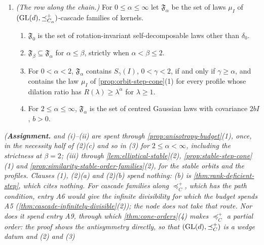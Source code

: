 \begin{theorem}
\begin{enumerate}
\begin{enumerate}
is the family of kernels from scale zero of a $(\GL(d), \preceq^+_C)$-cascade family if and only if
$\gamma \ge \beta(C)$. A $(\GL(d), \preceq^+_C)$-cascade family whose $\mu_I$ is not Gaussian exists if and only
if $\beta(C) < 2$; if $\beta(C) \ge 2$, the families are, as in (b), exactly the restrictions to the pairs
$\Sigma \preceq^+_C \Sigma'$ of the affine Gaussian scale spaces \ref{eq:affine-gaussian}, $b > 0$.
\end{enumerate}
\item \emph{(The row along the chain.)} For $0 \le \alpha \le \infty$ let $\mathfrak F_\alpha$ be the set of
laws $\mu_I$ of $(\mathrm{GL}(d), \preceq^+_{C_\alpha})$-cascade families of kernels.
\begin{enumerate}
\item[(a)] $\mathfrak F_0$ is the set of rotation-invariant self-decomposable laws other than $\delta_0$.
\item[(b)] $\mathfrak F_\beta \subseteq \mathfrak F_\alpha$ for $\alpha \le \beta$, strictly when
$\alpha < \beta \le 2$.
\item[(c)] For $0 < \alpha < 2$, $\mathfrak F_\alpha$ contains $S_\gamma(I)$, $0 < \gamma < 2$, if and only
if $\gamma \ge \alpha$, and contains the law $\mu_I$ of \ref{prop:orbit-step-cone}(1) for every profile whose
dilation ratio has $R(\lambda) \ge \lambda^\alpha$ for $\lambda \ge 1$.
\item[(d)] For $2 \le \alpha \le \infty$, $\mathfrak F_\alpha$ is the set of centred Gaussian laws with
covariance $2bI$, $b > 0$.
\end{enumerate}
\end{enumerate}
\statusA\quad{}\quad{}\quad\emph{(\textbf{Assignment.}  and (i)--(ii)
are spent through \ref{prop:anisotropy-budget}(1), once, in the necessity half of (2)(c) and so in (3) for
$2 \le \alpha < \infty$, including the strictness at $\beta = 2$; (iii) through \ref{lem:elliptical-stable}(2), \ref{prop:stable-step-cone}(1)
and \ref{prop:similarity-stable-order-families}(2), for the stable orbits and the profiles. Clauses (1), (2)(a)
and (2)(b) spend nothing: (b) is \ref{thm:rank-deficient-step}, which cites nothing. For cascade families
along $\preceq^+_C$, which has the path condition, entry A6 would give the infinite divisibility for which the
budget spends A5 (\ref{thm:cascade-infinitely-divisible}(2)); the node does not take that route.
Nor does it spend entry A9, through which \ref{thm:cone-orders}(4) makes $\preceq^+_C$ a partial order:
the proof shows the antisymmetry directly, so that $(\GL(d), \preceq^+_C)$ is a wedge datum and (2) and (3)
}
\end{theorem}

